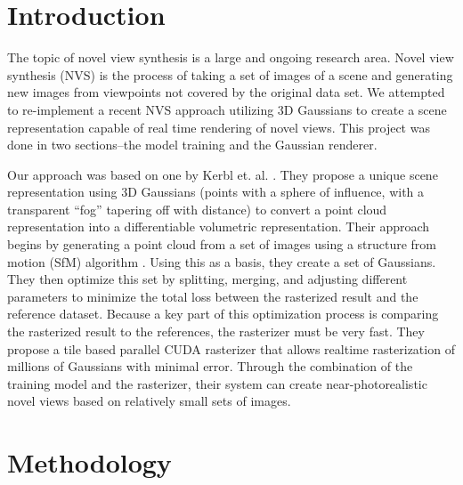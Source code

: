 \documentclass[12pt, a4paper, twocolumn]{article}
\begin{document}

\onecolumn
\maketitle
\begin{abstract}
    \abstractText
\end{abstract}

\twocolumn


\section{Introduction}

The topic of novel view synthesis is a large and ongoing research area. Novel view synthesis (NVS) is the process of taking a set of images of a scene and generating new images from viewpoints not covered by the original data set. We attempted to re-implement a recent NVS approach utilizing 3D Gaussians to create a scene representation capable of real time rendering of novel views. This project was done in two sections--the model training and the Gaussian renderer.

Our approach was based on one by Kerbl et. al. \cite{kerbl20233d}. They propose a unique scene representation using 3D Gaussians (points with a sphere of influence, with a transparent ``fog'' tapering off with distance) to convert a point cloud representation into a differentiable volumetric representation. Their approach begins by generating a point cloud from a set of images using a structure from motion (SfM) algorithm \cite{Ko2016PointCG}. Using this as a basis, they create a set of Gaussians. They then optimize this set by splitting, merging, and adjusting different parameters to minimize the total loss between the rasterized result and the reference dataset. Because a key part of this optimization process is comparing the rasterized result to the references, the rasterizer must be very fast. They propose a tile based parallel CUDA rasterizer that allows realtime rasterization of millions of Gaussians with minimal error. Through the combination of the training model and the rasterizer, their system can create near-photorealistic novel views based on relatively small sets of images.

\section{Methodology}
\end{document}
